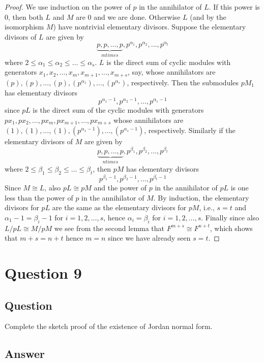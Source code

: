 \documentclass[11pt]{article}
\begin{document}
\begin{proof}
We use induction on the power of $p$ in the annihilator of $L$. If this power is $0$, then both $L$ and $M$ are $0$ and we are done. Otherwise $L$ (and by the isomorphism $M$) have nontrivial elementary divisors. Suppose the elementary divisors of $L$ are given by
\[\underbrace{p,p,\dots,p}_{m times}, p^{\alpha_1}, p^{\alpha_2}, \dots, p^{\alpha_t}\]
where $2 \leq \alpha_1 \leq \alpha_2 \leq \dots \leq \alpha_s$. $L$ is the direct sum of cyclic modules with generators $x_1, x_2, \dots , x_m, x_{m+1}, \dots, x_{m+s} $, say, whose annihilators are $(p), (p), \dots, (p), (p^{\alpha_1}), \dots, (p^{\alpha_s})$, respectively. Then the submodules $pM_1$ has elementary divisors
\[p^{\alpha_1-1}, p^{\alpha_2-1}, \dots, p^{\alpha_s-1}\]
since $pL$ is the direct sum of the cyclic modules with generators $px_1, px_2, \dots, px_m, px_{m+1}, \dots, px_{m+s}$ whose annihilators are $(1), (1), \dots, (1), (p^{\alpha_1-1}),\dots,(p^{\alpha_s-1})$, respectively. Similarly if the elementary divisors of $M$ are given by 
\[\underbrace{p,p,\dots,p}_{n times}, p^{\beta_1},p^{\beta_2}, \dots, p^{\beta_t}\]
where $2 \leq \beta_1\leq \beta_2 \leq \dots \leq \beta_t$, then $pM$ has elementary divisors
\[p^{\beta_1-1},p^{\beta_2-1}, \dots, p^{\beta_t-1}\]
Since $M \cong L$, also $pL \cong p M$ and the power of $p$ in the annihilator of $pL$ is one less than the power of $p$ in the annihilator of $M$. By induction, the elementary divisors for $pL$ are the same as the elementary divisors for $pM$, i.e., $s=t$ and $\alpha_1 -1 = \beta_i-1$ for $i = 1,2, \dots, s$, hence $\alpha_i = \beta_i$ for $i=1,2,\dots, s$. Finally since also $L/pL \cong M /pM$ we see from the second lemma that $F^{m+s} \cong F^{n+t}$, which shows that $m+s = n+t$ hence $m=n$ since we have already seen $s=t$. 
\end{proof}
\section{Question 9}
\subsection{Question}
Complete the sketch proof of the existence of Jordan normal form.
\subsection{Answer}
\end{document}
